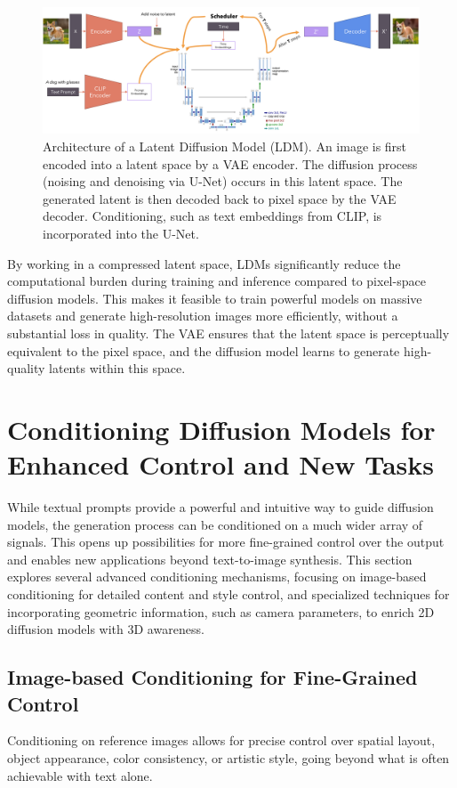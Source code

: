 \begin{figure}[h]
  \centering
  \includegraphics[width=\textwidth]{images/related-work/LDM-detailed.png}
  \caption{Architecture of a Latent Diffusion Model (LDM). An image is first encoded into a latent space by a VAE encoder. The diffusion process (noising and denoising via U-Net) occurs in this latent space. The generated latent is then decoded back to pixel space by the VAE decoder. Conditioning, such as text embeddings from CLIP, is incorporated into the U-Net.}
  \label{fig:ldm-architecture}
\end{figure}

By working in a compressed latent space, LDMs significantly reduce the computational burden during training and inference compared to pixel-space diffusion models. This makes it feasible to train powerful models on massive datasets and generate high-resolution images more efficiently, without a substantial loss in quality. The VAE ensures that the latent space is perceptually equivalent to the pixel space, and the diffusion model learns to generate high-quality latents within this space.

\section{Conditioning Diffusion Models for Enhanced Control and New Tasks}\label{sec:conditioning-diffusion}

While textual prompts provide a powerful and intuitive way to guide diffusion models, the generation process can be conditioned on a much wider array of signals. This opens up possibilities for more fine-grained control over the output and enables new applications beyond text-to-image synthesis. This section explores several advanced conditioning mechanisms, focusing on image-based conditioning for detailed content and style control, and specialized techniques for incorporating geometric information, such as camera parameters, to enrich 2D diffusion models with 3D awareness.

\subsection{Image-based Conditioning for Fine-Grained Control}
Conditioning on reference images allows for precise control over spatial layout, object appearance, color consistency, or artistic style, going beyond what is often achievable with text alone.

